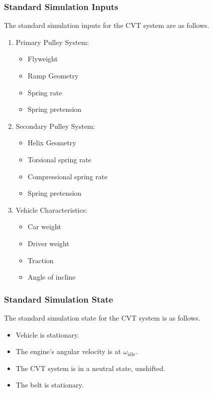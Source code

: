 \documentclass[12pt, titlepage]{article}
\begin{document}


\subsubsection*{Standard Simulation Inputs}
\label{sec:standard_inputs}
The standard simulation inputs for the CVT system are as follows.
\begin{enumerate}
  \item Primary Pulley System:
  \begin{itemize}
    \item Flyweight
    \item Ramp Geometry
    \item Spring rate
    \item Spring pretension
  \end{itemize}
  \item Secondary Pulley System:
  \begin{itemize}
    \item Helix Geometry
    \item Torsional spring rate
    \item Compressional spring rate
    \item Spring pretension
  \end{itemize}
  \item Vehicle Characteristics:
  \begin{itemize}
    \item Car weight
    \item Driver weight
    \item Traction
    \item Angle of incline
  \end{itemize}
\end{enumerate}

\subsubsection*{Standard Simulation State}
\label{sec:standard_state}
The standard simulation state for the CVT system is as follows.
\begin{itemize}
  \item Vehicle is stationary.
  \item The engine's angular velocity is at $\omega_\text{idle}$.
  \item The CVT system is in a neutral state, unshifted.
  \item The belt is stationary.
\end{itemize}
\end{document}
